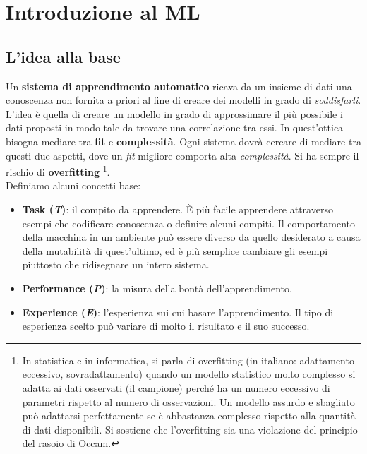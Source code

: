 \chapter{Introduzione al ML}
\label{Capitolo 1}

\section{L'idea alla base}
Un \textbf{sistema di apprendimento automatico} ricava da un insieme di dati
una conoscenza non fornita a priori al fine di creare dei modelli in grado di \textit{soddisfarli}. 
L'idea è quella di creare un modello in grado di approssimare il più possibile i dati proposti 
in modo tale da trovare una correlazione tra essi. In
quest'ottica bisogna mediare tra \textbf{fit} e \textbf{complessità}. Ogni
sistema dovrà cercare di mediare tra questi due aspetti, dove un \textit{fit}
migliore comporta alta \textit{complessità}. Si ha sempre il rischio di \textbf{overfitting} 
\footnote{In statistica e in informatica, si parla di overfitting (in italiano: adattamento eccessivo, sovradattamento) quando un modello statistico molto complesso si adatta ai dati osservati (il campione) perché ha un numero eccessivo di parametri rispetto al numero di osservazioni.
Un modello assurdo e sbagliato può adattarsi perfettamente se è abbastanza complesso rispetto alla quantità di dati disponibili.
Si sostiene che l'overfitting sia una violazione del principio del rasoio di Occam. }.\\
Definiamo alcuni concetti base:
\begin{itemize}
  \item \textbf{Task (\textit{T})}: il compito da apprendere. È più facile
  apprendere attraverso esempi che codificare conoscenza o definire alcuni
  compiti. Il comportamento della macchina in un ambiente può essere
  diverso da quello desiderato a causa della mutabilità di quest'ultimo, ed è più
  semplice cambiare gli esempi piuttosto che ridisegnare un intero sistema. 
  \item \textbf{Performance (\textit{P})}: la misura della bontà
  dell'apprendimento.
  \item \textbf{Experience (\textit{E})}: l'esperienza sui cui basare
  l'apprendimento. Il tipo di esperienza scelto può variare di molto il risultato e
  il suo successo.
\end{itemize}
